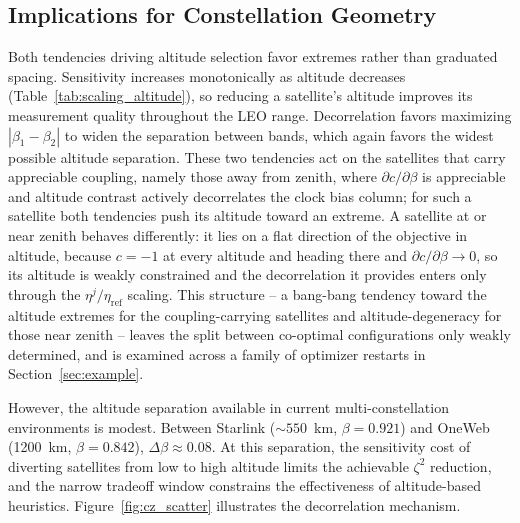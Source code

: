 \documentclass[letterpaper,times]{IONconf-v2}
\theoremstyle{plain}
\theoremstyle{remark}
\begin{document}
\vspace{-5pt}

\subsection{Implications for Constellation Geometry}\label{subsec:implications}

Both tendencies driving altitude selection favor extremes rather than graduated spacing. Sensitivity increases monotonically as altitude decreases (Table~\ref{tab:scaling_altitude}), so reducing a satellite's altitude improves its measurement quality throughout the LEO range. Decorrelation favors maximizing $|\beta_1 - \beta_2|$ to widen the separation between bands, which again favors the widest possible altitude separation. These two tendencies act on the satellites that carry appreciable coupling, namely those away from zenith, where $\partial c/\partial\beta$ is appreciable and altitude contrast actively decorrelates the clock bias column; for such a satellite both tendencies push its altitude toward an extreme. A satellite at or near zenith behaves differently: it lies on a flat direction of the objective in altitude, because $c = -1$ at every altitude and heading there and $\partial c/\partial\beta \to 0$, so its altitude is weakly constrained and the decorrelation it provides enters only through the $\eta^j/\eta_{\mathrm{ref}}$ scaling. This structure -- a bang-bang tendency toward the altitude extremes for the coupling-carrying satellites and altitude-degeneracy for those near zenith -- leaves the split between co-optimal configurations only weakly determined, and is examined across a family of optimizer restarts in Section~\ref{sec:example}.

However, the altitude separation available in current multi-constellation environments is modest. Between Starlink (${\sim}550$~km, $\beta = 0.921$) and OneWeb (1200~km, $\beta = 0.842$), $\Delta\beta \approx 0.08$. At this separation, the sensitivity cost of diverting satellites from low to high altitude limits the achievable $\zeta^2$ reduction, and the narrow tradeoff window constrains the effectiveness of altitude-based heuristics. Figure~\ref{fig:cz_scatter} illustrates the decorrelation mechanism.

\vspace{-10pt}
\end{document}
